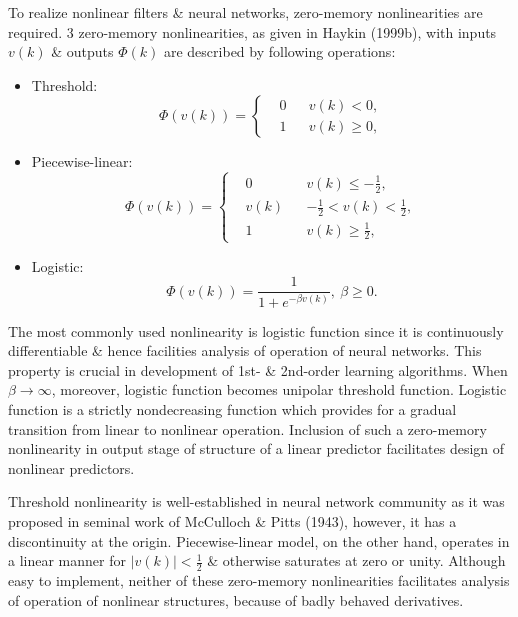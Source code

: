 \documentclass{article}
\begin{document}
\begin{enumerate}
\begin{itemize}
\begin{itemize}
			To realize nonlinear filters \& neural networks, zero-memory nonlinearities are required. 3 zero-memory nonlinearities, as given in Haykin (1999b), with inputs $v(k)$ \& outputs $\Phi(k)$ are described by following operations:
			\begin{itemize}
				\item Threshold:
				\begin{equation}
					\Phi(v(k)) = \left\{\begin{split}
						&0&&v(k) < 0,\\
						&1&&v(k)\ge 0,
					\end{split}\right.
				\end{equation}
				\item Piecewise-linear:
				\begin{equation}
					\Phi(v(k)) = \left\{\begin{split}
						&0&&v(k)\le-\frac{1}{2},\\
						&v(k)&&-\frac{1}{2} < v(k) < \frac{1}{2},\\
						&1&&v(k)\ge\frac{1}{2},
					\end{split}\right.
				\end{equation}
				\item Logistic:
				\begin{equation}
					\Phi(v(k)) = \frac{1}{1 + e^{-\beta v(k)}},\ \beta\ge0.
				\end{equation}
			\end{itemize}
			The most commonly used nonlinearity is logistic function since it is continuously differentiable \& hence facilities analysis of operation of neural networks. This property is crucial in development of 1st- \& 2nd-order learning algorithms. When $\beta\to\infty$, moreover, logistic function becomes unipolar threshold function. Logistic function is a strictly nondecreasing function which provides for a gradual transition from linear to nonlinear operation. Inclusion of such a zero-memory nonlinearity in output stage of structure of a linear predictor facilitates design of nonlinear predictors.
			
			Threshold nonlinearity is well-established in neural network community as it was proposed in seminal work of McCulloch \& Pitts (1943), however, it has a discontinuity at the origin. Piecewise-linear model, on the other hand, operates in a linear manner for $|v(k)| < \frac{1}{2}$ \& otherwise saturates at zero or unity. Although easy to implement, neither of these zero-memory nonlinearities facilitates analysis of operation of nonlinear structures, because of badly behaved derivatives.
			

\end{itemize}
\end{itemize}
\end{enumerate}
\end{document}
